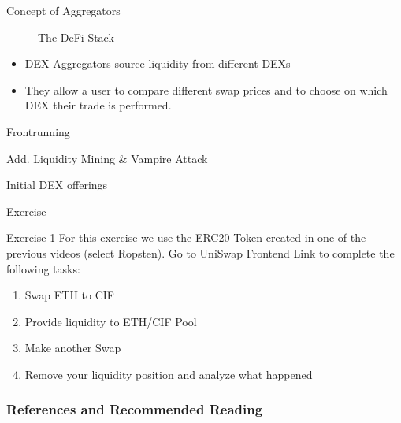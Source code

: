 \documentclass[]{beamer}
\begin{document}
\begin{frame}{Concept of Aggregators}

\begin{figure}[t]
	\centering	
	\resizebox{0.8\textwidth}{!}{
	\begin{tikzpicture}[scale=1.0, every node/.style={scale=1.0}]
			
	\end{tikzpicture}}
	\caption{The DeFi Stack \cite{FS:21}}
\end{figure}
\vspace{-1em}
\begin{itemize}
	\item DEX Aggregators source liquidity from different DEXs
	\item They allow a user to compare different swap prices and to choose on which DEX their trade is performed.
\end{itemize}


\end{frame}


\begin{frame}{Frontrunning}

\end{frame}


\begin{frame}{Add. Liquidity Mining \& Vampire Attack}

\end{frame}


\begin{frame}{Initial DEX offerings}

\end{frame}


\begin{frame}{Exercise}
	\begin{exercise}{Exercise 1}
	For this exercise we use the ERC20 Token created in one of the previous videos (select Ropsten). Go to UniSwap Frontend Link to complete the following tasks:
	
		\begin{enumerate}
			\item Swap ETH to CIF
			\item Provide liquidity to ETH/CIF Pool
			\item Make another Swap
			\item Remove your liquidity position and analyze what happened
		\end{enumerate}
	\end{exercise}
\end{frame}



\begin{frame}%
\frametitle{References and Recommended Reading}
	
	
\end{frame}
\end{document}
